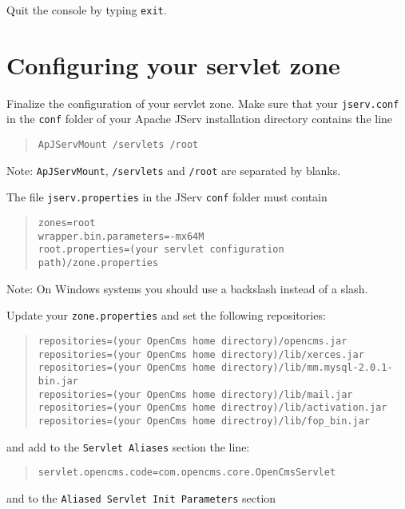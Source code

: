 Quit the console by typing \texttt{exit}.

\section{Configuring your servlet zone}
Finalize the configuration of your servlet zone. Make sure that your \texttt{jserv.conf} in 
the \texttt{conf} folder of your Apache JServ installation directory contains the line

\begin{quote}
\begin{verbatim}
ApJServMount /servlets /root
\end{verbatim}
\end{quote}

Note: \texttt{ApJServMount}, \texttt{/servlets} and \texttt{/root} are separated by blanks.

The file \texttt{jserv.properties} in the JServ \texttt{conf} folder must contain

\begin{quote}
\texttt{zones=root\\
wrapper.bin.parameters=-mx64M\\
root.properties=(your servlet configuration path)/zone.properties}
\end{quote}

Note: On Windows systems you should use a backslash instead of a slash. 

Update your \texttt{zone.properties} and set the following repositories: 

\begin{quote}
\begin{verbatim}
repositories=(your OpenCms home directory)/opencms.jar
repositories=(your OpenCms home directory)/lib/xerces.jar
repositories=(your OpenCms home directory)/lib/mm.mysql-2.0.1-bin.jar
repositories=(your OpenCms home directory)/lib/mail.jar
repositories=(your OpenCms home directroy)/lib/activation.jar
repositories=(your OpenCms home directroy)/lib/fop_bin.jar
\end{verbatim}
\end{quote}

and add to the \texttt{Servlet Aliases} section the line: 

\begin{quote}
\texttt{servlet.opencms.code=com.opencms.core.OpenCmsServlet} 
\end{quote}

and to the \texttt{Aliased Servlet Init Parameters} section 

